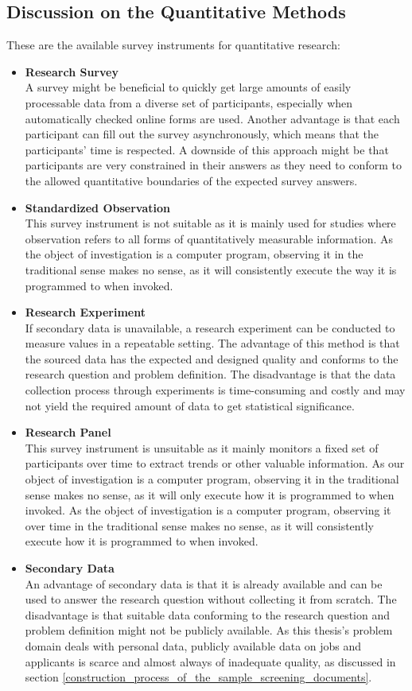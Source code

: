 \documentclass[draft,final]{thesisclass} %
\begin{document}
\subsection{Discussion on the Quantitative Methods}
These are the available survey instruments for quantitative research:
\begin{itemize}
    \item \textbf{Research Survey}\\
    A survey might be beneficial to quickly get large amounts of easily processable data from a diverse set of participants, especially when automatically checked online forms are used.
    Another advantage is that each participant can fill out the survey asynchronously, which means that the participants' time is respected.
    A downside of this approach might be that participants are very constrained in their answers as they need to conform to the allowed quantitative boundaries of the expected survey answers.
    \item \textbf{Standardized Observation}\\
    This survey instrument is not suitable as it is mainly used for studies where observation refers to all forms of quantitatively measurable information.
    As the object of investigation is a computer program, observing it in the traditional sense makes no sense, as it will consistently execute the way it is programmed to when invoked.
    \item \textbf{Research Experiment}\\
    If secondary data is unavailable, a research experiment can be conducted to measure values in a repeatable setting.
    The advantage of this method is that the sourced data has the expected and designed quality and conforms to the research question and problem definition.
    The disadvantage is that the data collection process through experiments is time-consuming and costly and may not yield the required amount of data to get statistical significance.
    \item \textbf{Research Panel}\\
    This survey instrument is unsuitable as it mainly monitors a fixed set of participants over time to extract trends or other valuable information. As our object of investigation is a computer program, observing it in the traditional sense makes no sense, as it will only execute how it is programmed to when invoked.
    As the object of investigation is a computer program, observing it over time in the traditional sense makes no sense, as it will consistently execute how it is programmed to when invoked.
    \item \textbf{Secondary Data}\\
    An advantage of secondary data is that it is already available and can be used to answer the research question without collecting it from scratch.
    The disadvantage is that suitable data conforming to the research question and problem definition might not be publicly available.
    As this thesis's problem domain deals with personal data, publicly available data on jobs and applicants is scarce and almost always of inadequate quality, as discussed in section \ref{construction_process_of_the_sample_screening_documents}.
\end{itemize}
\end{document}
